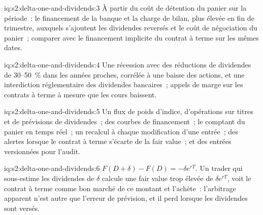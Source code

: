 \begin{solution}{iq:s2:delta-one-and-dividends:3}
À partir du coût de détention du panier sur la période~: le financement de la banque et la charge de bilan, plus élevée en fin de trimestre, auxquels
s'ajoutent les dividendes reversés et le coût de négociation du panier~; comparer avec le financement implicite du contrat à terme sur les mêmes dates.
\end{solution}

\begin{solution}{iq:s2:delta-one-and-dividends:4}
Une récession avec des réductions de dividendes de 30--50~\% dans les années proches, corrélée à une baisse des actions, et une interdiction réglementaire des dividendes bancaires~; appels de marge sur
les contrats à terme à mesure que les cours baissent.
\end{solution}

\begin{solution}{iq:s2:delta-one-and-dividends:5}
Un flux de poids d'indice, d'opérations sur titres et de prévisions de dividendes~; des courbes de financement~; le comptant du panier en temps réel~; un recalcul à chaque modification d'une entrée~;
des alertes lorsque le contrat à terme s'écarte de la fair value~; et des entrées versionnées pour l'audit.
\end{solution}

\begin{solution}{iq:s2:delta-one-and-dividends:6}
$F(D + \delta) - F(D) = -\delta e^{rT}$. Un trader qui sous-estime les dividendes de $\delta$ calcule une fair value trop élevée de $\delta e^{rT}$, voit le
contrat à terme comme bon marché de ce montant et l'achète~: l'arbitrage apparent n'est autre que l'erreur de prévision, et il perd lorsque les dividendes sont versés.
\end{solution}
